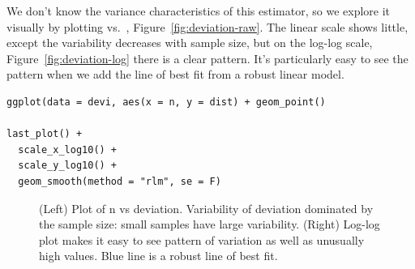 \documentclass[article]{jss}
\begin{document}
We don't know the variance characteristics of this estimator, so we explore it visually by plotting  vs.\ , Figure~\ref{fig:deviation-raw}. The linear scale shows little, except the variability decreases with sample size, but on the log-log scale, Figure~\ref{fig:deviation-log} there is a clear pattern. It's particularly easy to see the pattern when we add the line of best fit from a robust linear model. 

\begin{Verbatim}
ggplot(data = devi, aes(x = n, y = dist) + geom_point()

last_plot() + 
  scale_x_log10() + 
  scale_y_log10() +
  geom_smooth(method = "rlm", se = F)
\end{Verbatim}

\begin{figure}[htbp]
  \centering

  \caption{(Left) Plot of n vs deviation. Variability of deviation dominated by the sample size: small samples have large variability. (Right) Log-log plot makes it easy to see pattern of variation as well as unusually high values.  Blue line is a robust line of best fit.}
  \label{fig:deviation}
\end{figure}
\end{document}
